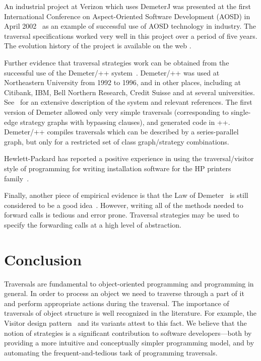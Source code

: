 An industrial project at Verizon which uses DemeterJ was presented at
the first International Conference on Aspect-Oriented Software
Development (AOSD) in April 2002~\cite{aosd-2002-blando} as an example
of successful use of AOSD technology in industry. The traversal
specifications worked very well in this project over a period of five
years. The evolution history of the project is available on the web
\cite{blando:97-02}.
 
Further evidence that traversal strategies work can be obtained from
the successful use of the Demeter/\C++ system~\cite{karl:demeter}.
Demeter/\C++ was used at Northeastern University from 1992 to 1996, and
in other places, including at Citibank, IBM, Bell Northern Research,
Credit Suisse and at several universities. See~\cite{URL:demeter} for
an extensive description of the system and relevant references.  The
first version of Demeter allowed only very simple traversals
(corresponding to single-edge strategy graphs with bypassing clauses),
and generated code in \C++.  Demeter/\C++ compiles traversals which
can be described by a series-parallel graph, but only for a restricted
set of class graph/strategy combinations.

Hewlett-Packard has reported a positive experience in using the
traversal/visitor style of programming for writing installation
software for the HP printers family~\cite{URL:hp-praise}.

Finally, another piece of empirical evidence is that the Law of
Demeter~\cite{karl-ian:soft1} is still considered to be a good
idea~\cite{hunt-thomas:TPP}. However, writing all of the methods
needed to forward calls is tedious and error prone. Traversal
strategies may be used to specify the forwarding calls at a high level
of abstraction.


\section{Conclusion}
\label{sec-conc}
Traversals are fundamental to object-oriented programming and
programming in general. In order to process an object we need to
traverse through a part of it and perform appropriate actions during
the traversal.  The importance of traversals of object structure is
well recognized in the literature.  For example, the Visitor design
pattern~\cite{gang-of-4} and its variants
\cite{Vlissides:visitor,Vlissides:observer,palsberg:jay} attest to
this fact.  We believe that the notion of strategies is a significant
contribution to software developers---both by providing a more
intuitive and conceptually simpler programming model, and by
automating the frequent-and-tedious task of programming traversals.

